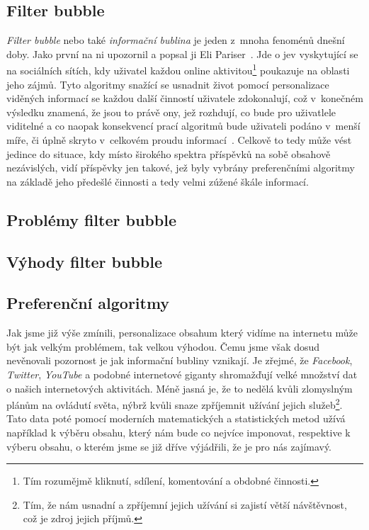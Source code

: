 \documentclass[12pt, a4paper]{article}
\numberwithin{equation}{section} 	%
\begin{document}
\subsection{Filter bubble}
\noindent \textit{Filter bubble} nebo také \textit{informační bublina} je jeden z mnoha fenoménů dnešní doby. Jako první na ni upozornil a popsal ji Eli Pariser~\cite{Pariser2011, PariserTed}. Jde o jev vyskytující se na sociálních sítích, kdy uživatel každou online aktivitou\footnote{Tím rozumějmě kliknutí, sdílení, komentování a obdobné činnosti.} poukazuje na oblasti jeho zájmů. Tyto algoritmy snažící se usnadnit život pomocí personalizace viděných informací se každou další činností uživatele zdokonalují, což v konečném výsledku znamená, že jsou to právě ony, jež rozhdují, co bude pro uživatlele viditelné a co naopak konsekvencí prací algoritmů bude uživateli podáno v menší míře, či úplně skryto v celkovém proudu informací~\cite{TheImpactOfFilterBubble}. Celkově to tedy může vést jedince do situace, kdy místo širokého spektra příspěvků na sobě obsahově nezávislých, vidí příspěvky jen takové, jež byly vybrány preferenčními algoritmy na základě jeho předešlé činnosti a tedy velmi zúžené škále informací.

\cite{wikiTwitter}
\cite{whyNewsOnTwitter}


\subsection{Problémy filter bubble}
\subsection{Výhody filter bubble}
\subsection{Preferenční algoritmy}
\noindent Jak jsme již výše zmínili, personalizace obsahum který vidíme na internetu může být jak velkým problémem, tak velkou výhodou. Čemu jsme však dosud nevěnovali pozornost je jak informační bubliny vznikají. Je zřejmé, že \textit{Facebook}, \textit{Twitter}, \textit{YouTube} a podobné internetové giganty shromažďují velké množství dat o našich internetových aktivitách. Méně jasná je, že to nedělá kvůli zlomyslným plánům na ovládutí světa, nýbrž kvůli snaze zpříjemnit užívání jejich služeb\footnote{Tím, že nám usnadní a zpříjemní jejich užívání si zajistí větší návštěvnost, což je zdroj jejich příjmů.}. Tato data poté pomocí moderních matematických a statistických metod užívá například k výběru obsahu, který nám bude co nejvíce imponovat, respektive k výberu obsahu, o kterém jsme se již dříve výjádřili, že je pro nás zajímavý.
\end{document}
